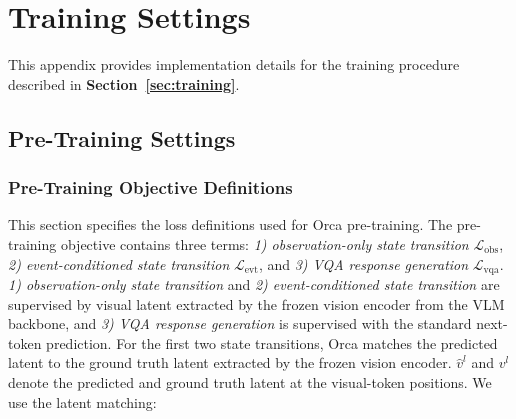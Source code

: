 \section{Training Settings}
\label{sec:appendix_training}

\renewcommand{\thefigure}{C\arabic{figure}}
\renewcommand{\theHfigure}{C\arabic{figure}}
\setcounter{figure}{0}

\renewcommand{\thetable}{C\arabic{table}}
\renewcommand{\theHtable}{C\arabic{table}}
\setcounter{table}{0}

\renewcommand{\theequation}{C-\arabic{equation}}
\renewcommand{\theHequation}{C-\arabic{equation}}
\setcounter{equation}{0}

This appendix provides implementation details for the training procedure described in \textbf{Section~\ref{sec:training}}. 



\subsection{Pre-Training Settings}
\label{sec:appendix_pretraining_settings}


\subsubsection{Pre-Training Objective Definitions}
\label{sec:appendix_pretraining_objective}
This section specifies the loss definitions used for Orca pre-training. The pre-training objective contains three terms: \textit{1) observation-only state transition} \(\mathcal{L}_{\mathrm{obs}}\), \textit{2) event-conditioned state transition} \(\mathcal{L}_{\mathrm{evt}}\), and \textit{3) VQA response generation} \(\mathcal{L}_{\mathrm{vqa}}\). 
\textit{1) observation-only state transition} and \textit{2) event-conditioned state transition} are supervised by visual latent extracted by the frozen vision encoder from the VLM backbone, and \textit{3) VQA response generation} is supervised with the standard next-token prediction. For the first two state transitions, Orca matches the predicted latent to the ground truth latent extracted by the frozen vision encoder. \(\hat{v}^l\) and \(v^l\) denote the predicted and ground truth latent at the visual-token positions. We use the latent matching: 


